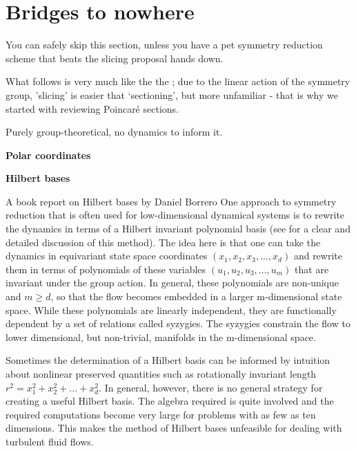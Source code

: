 
\section{Bridges to nowhere}
\label{s:bridge}

You can safely skip this section, unless you have a pet symmetry reduction scheme that
beats the slicing proposal hands down.

What follows is very much like the the ; due to the linear
action of the symmetry group, 'slicing' is easier that `sectioning', but
more unfamiliar - that is why we started with reviewing Poincar\'e
sections.


Purely group-theoretical, no dynamics to inform it.

{\bf Polar coordinates}

{\bf Hilbert bases}

    {A book report on Hilbert bases by Daniel Borrero}
One approach to symmetry reduction that is often used for low-dimensional
dynamical systems is to rewrite the dynamics in terms of a Hilbert
invariant polynomial basis (see  for a clear and
detailed discussion of this method). The idea here is that one can take
the dynamics in equivariant state space coordinates
$(x_1,x_2,x_3,...,x_d)$ and rewrite them in terms of polynomials of these
variables $(u_1,u_2,u_3,...,u_m)$ that are invariant under the group
action. In general, these polynomials are non-unique and $m \geq d$, so
that the flow becomes embedded in a larger m-dimensional state space.
While these polynomials are linearly independent, they are functionally
dependent by a set of relations called syzygies. The syzygies constrain
the flow to lower dimensional, but non-trivial, manifolds in the
m-dimensional space.

Sometimes the determination of a Hilbert basis can be informed by
intuition about nonlinear preserved quantities such as rotationally
invariant length $r^2 = x_1^2 + x_2^2 + ... + x_d^2$. In general,
however, there is no general strategy for creating a useful Hilbert
basis. The algebra required is quite involved and the required
computations become very large for problems with as few as ten
dimensions. This makes the method of Hilbert bases
unfeasible for dealing with turbulent fluid flows.

